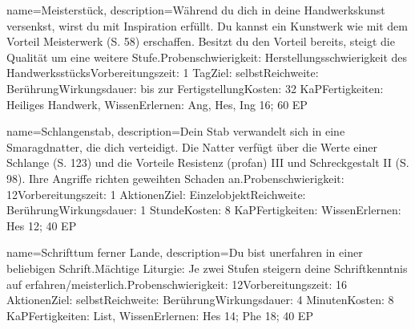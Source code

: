 {
    name={Meisterstück},
    description={Während du dich in deine Handwerkskunst versenkst, wirst du mit Inspiration erfüllt. Du kannst ein Kunstwerk wie mit dem Vorteil Meisterwerk (S. 58) erschaffen. Besitzt du den Vorteil bereits, steigt die Qualität um eine weitere Stufe.\newline Probenschwierigkeit: Herstellungsschwierigkeit des Handwerksstücks\newline Vorbereitungszeit: 1 Tag\newline Ziel: selbst\newline Reichweite: Berührung\newline Wirkungsdauer: bis zur Fertigstellung\newline Kosten: 32 KaP\newline Fertigkeiten: Heiliges Handwerk, Wissen\newline Erlernen: Ang, Hes, Ing 16; 60 EP}
}


{
    name={Schlangenstab},
    description={Dein Stab verwandelt sich in eine Smaragdnatter, die dich verteidigt. Die Natter verfügt über die Werte einer Schlange (S. 123) und die Vorteile Resistenz (profan) III und Schreckgestalt II (S. 98). Ihre Angriffe richten geweihten Schaden an.\newline Probenschwierigkeit: 12\newline Vorbereitungszeit: 1 Aktionen\newline Ziel: Einzelobjekt\newline Reichweite: Berührung\newline Wirkungsdauer: 1 Stunde\newline Kosten: 8 KaP\newline Fertigkeiten: Wissen\newline Erlernen: Hes 12; 40 EP}
}


{
    name={Schrifttum ferner Lande},
    description={Du bist unerfahren in einer beliebigen Schrift.\newline Mächtige Liturgie: Je zwei Stufen steigern deine Schriftkenntnis auf erfahren/meisterlich.\newline Probenschwierigkeit: 12\newline Vorbereitungszeit: 16 Aktionen\newline Ziel: selbst\newline Reichweite: Berührung\newline Wirkungsdauer: 4 Minuten\newline Kosten: 8 KaP\newline Fertigkeiten: List, Wissen\newline Erlernen: Hes 14; Phe 18; 40 EP}
}


